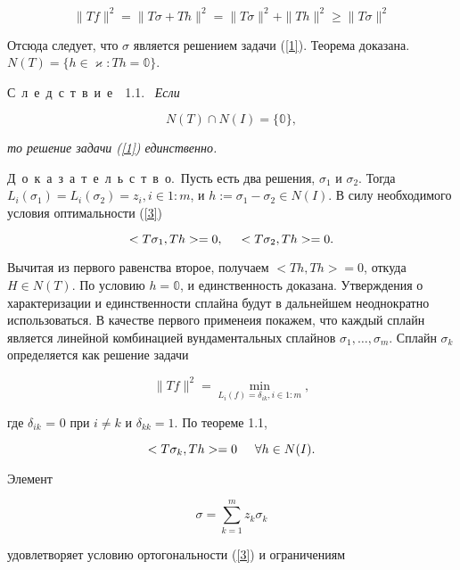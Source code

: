 \documentclass{book}
\newcommand{\proof}{Д~о~к~а~з~а~т~е~л~ь~с~т~в~о.\ }
\newcommand{\cons}[1]{С~л~е~д~с~т~в~и~е~~#1.\ }
\begin{document}
\begin{equation*}
\|Tf\|^2=\|T\sigma+Th\|^2=\|T\sigma\|^2+\|Th\|^2\geq\|T\sigma\|^2
\end{equation*}

\noindent Отсюда следует, что $\sigma$ является решением задачи (\ref{1}). Теорема доказана.
 $N(T)=\{h\in\varkappa:Th=\mathbb{0}\}$.
\par\cons{1.1} \textit{Если}

\begin{equation*}
N(T)\cap N(I)=\{\mathbb{0}\},
\end{equation*}

\textit{то решение задачи \textup{(\ref{1})} единственно.}
\par\proof Пусть есть два решения, $\sigma_1$ и $\sigma_2$. Тогда $L_i(\sigma_1)=L_i(\sigma_2)=z_i, i \in 1:m$, и $h:=\sigma_1-\sigma_2\in N(I)$. В силу необходимого условия оптимальности (\ref{3})

 \begin{equation*}
<T\sigma_1,Th>=0,\hspace{5mm}<T\sigma_2,Th>=0.
\end{equation*}

Вычитая из первого равенства второе, получаем $<Th,Th>=0$, откуда $H\in N(T)$. По условию $h=\mathbb{0}$, и единственность доказана. Утверждения о характеризации и единственности сплайна будут в дальнейшем неоднократно использоваться. В качестве первого применеия покажем, что каждый сплайн является линейной комбинацией вундаментальных сплайнов $\sigma_1, \dots, \sigma_m$. Сплайн $\sigma_k$ определяется как решение задачи

\begin{equation*}
\|Tf\|^2=\min_{L_i(f)=\delta_{ik}, i\in1:m},
\end{equation*}

\noindent где $\delta_{ik}$ = 0 при $i\neq k$ и $\delta_{kk}=1$. По теореме 1.1,

\begin{equation*}
<T\sigma_k, Th>=0 \hspace{5mm} \forall h \in N(I).
\end{equation*}

Элемент

\begin{equation*}
\sigma=\sum_{k=1}^m z_k \sigma_k
\end{equation*}

\noindent удовлетворяет условию ортогональности (\ref{3}) и ограничениям
\end{document}
